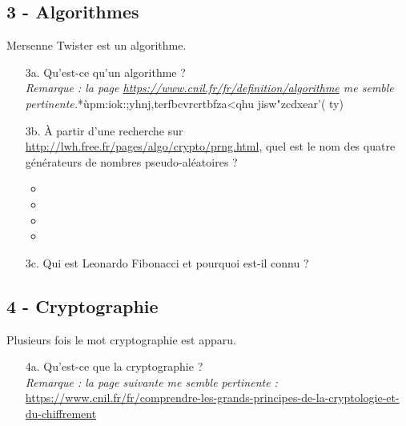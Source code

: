 \newpage

\subsection*{3 - Algorithmes}

Mersenne Twister est un algorithme. 

\begin{enumerate}
    \item[3a.] Qu’est-ce qu'un algorithme ? \\
    \textit{Remarque : la page \url{https://www.cnil.fr/fr/definition/algorithme} me semble pertinente.}*ùpm:iok:;yhnj,terfbcvrcrtbfza<qhu jisw"zcdxear'(  ty) \\
    \Pointilles[8]

    \item[3b.] À partir d'une recherche  sur \url{http://lwh.free.fr/pages/algo/crypto/prng.html}, quel est le nom des quatre générateurs de nombres pseudo-aléatoires ?
    
    \begin{itemize}[label={$\bullet$}]
        \item \dotfill
        \item \dotfill
        \item \dotfill
        \item \dotfill
    \end{itemize} 

    \item[3c.] Qui est Leonardo Fibonacci et pourquoi est-il connu ? \\ \Pointilles[8]
\end{enumerate} 

\subsection*{4 - Cryptographie}

Plusieurs fois le mot cryptographie est apparu. 

\begin{enumerate}
    \item[4a.] Qu'est-ce que la cryptographie ? \\
\textit{Remarque : la page suivante me semble pertinente :} \\
\url{https://www.cnil.fr/fr/comprendre-les-grands-principes-de-la-cryptologie-et-du-chiffrement} \\ \Pointilles[6]
\end{enumerate} 

